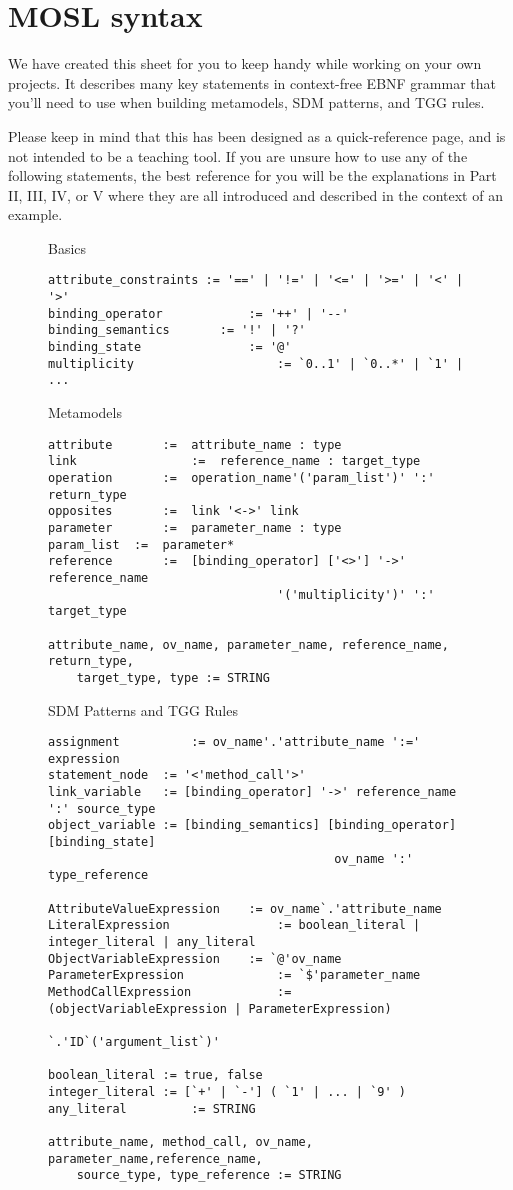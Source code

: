 \newpage
\section{MOSL syntax}
\texHeader

We have created this sheet for you to keep handy while working on your own projects. It describes many key statements in context-free EBNF grammar that you'll
need to use when building metamodels, SDM patterns, and TGG rules.

Please keep in mind that this has been designed as a quick-reference page, and is not intended to be a teaching tool. If you are unsure how to use any
of the following statements, the best reference for you will be the explanations in Part II, III, IV, or V where they are all introduced and described in the
context of an example.

\begin{figure}[htbp]
Basics
\begin{lstlisting}[backgroundcolor=\color{codelightgray}]
attribute_constraints := '==' | '!=' | '<=' | '>=' | '<' | '>'
binding_operator 			:= '++' | '--'
binding_semantics 		:= '!' | '?'
binding_state 				:= '@'
multiplicity 					:= `0..1' | `0..*' | `1' | ...
\end{lstlisting}

Metamodels
\begin{lstlisting}[backgroundcolor=\color{codelightgray}]
attribute		:=	attribute_name : type
link				:=	reference_name : target_type
operation		:=	operation_name'('param_list')' ':' return_type
opposites		:=	link '<->' link
parameter		:=	parameter_name : type
param_list	:=	parameter*
reference		:=	[binding_operator] ['<>'] '->' reference_name 
								'('multiplicity')' ':' target_type

attribute_name, ov_name, parameter_name, reference_name, return_type, 
	target_type, type := STRING
\end{lstlisting}

SDM Patterns and TGG Rules
\begin{lstlisting}[backgroundcolor=\color{codelightgray}]
assignment			:= ov_name'.'attribute_name ':=' expression
statement_node	:= '<'method_call'>'
link_variable 	:= [binding_operator] '->' reference_name ':' source_type
object_variable := [binding_semantics] [binding_operator] [binding_state] 
										ov_name ':' type_reference
										
AttributeValueExpression 	:= ov_name`.'attribute_name
LiteralExpression 				:= boolean_literal | integer_literal | any_literal
ObjectVariableExpression 	:= `@'ov_name
ParameterExpression 			:= `$'parameter_name
MethodCallExpression 			:= (objectVariableExpression | ParameterExpression)
															`.'ID`('argument_list`)'

boolean_literal := true, false
integer_literal := [`+' | `-'] ( `1' | ... | `9' )
any_literal 		:= STRING

attribute_name, method_call, ov_name, parameter_name,reference_name, 
	source_type, type_reference := STRING
\end{lstlisting}
\end{figure}
